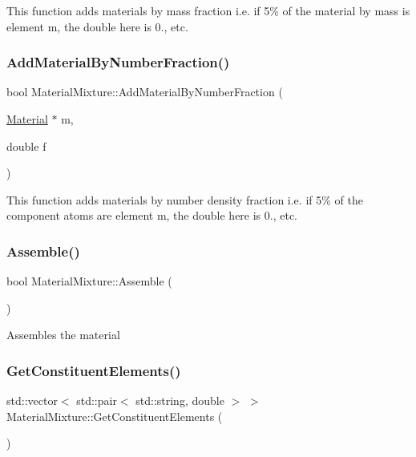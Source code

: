 This function adds materials by mass fraction i.\+e. if 5\% of the material by mass is element m, the double here is 0., etc. \mbox{\label{classMaterialMixture_ac5de09e88622268d97d7d0ebe541d097}} 
\subsubsection{\texorpdfstring{Add\+Material\+By\+Number\+Fraction()}{AddMaterialByNumberFraction()}}
{\footnotesize\ttfamily bool Material\+Mixture\+::\+Add\+Material\+By\+Number\+Fraction (\begin{DoxyParamCaption}\item[{\hyperlink{classMaterial}{Material} $\ast$}]{m,  }\item[{double}]{f }\end{DoxyParamCaption})}

This function adds materials by number density fraction i.\+e. if 5\% of the component atoms are element m, the double here is 0., etc. \mbox{\label{classMaterialMixture_aa7e9fe0d5261c41b91ecd9843887416e}} 
\subsubsection{\texorpdfstring{Assemble()}{Assemble()}}
{\footnotesize\ttfamily bool Material\+Mixture\+::\+Assemble (\begin{DoxyParamCaption}{ }\end{DoxyParamCaption})}

Assembles the material \mbox{\label{classMaterialMixture_a41c2bd2c8228e49ceb09b641935239b4}} 
\subsubsection{\texorpdfstring{Get\+Constituent\+Elements()}{GetConstituentElements()}}
{\footnotesize\ttfamily std\+::vector$<$ std\+::pair$<$ std\+::string, double $>$ $>$ Material\+Mixture\+::\+Get\+Constituent\+Elements (\begin{DoxyParamCaption}{ }\end{DoxyParamCaption})}

